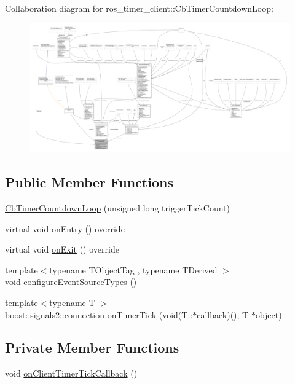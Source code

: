 Collaboration diagram for ros\+\_\+timer\+\_\+client\+:\+:Cb\+Timer\+Countdown\+Loop\+:
\nopagebreak
\begin{figure}[H]
\begin{center}
\leavevmode
\includegraphics[width=350pt]{classros__timer__client_1_1CbTimerCountdownLoop__coll__graph}
\end{center}
\end{figure}
\subsection*{Public Member Functions}
\begin{DoxyCompactItemize}
\item 
\hyperlink{classros__timer__client_1_1CbTimerCountdownLoop_aadceff62d42bac73682da8d729fe9c36}{Cb\+Timer\+Countdown\+Loop} (unsigned long trigger\+Tick\+Count)
\item 
virtual void \hyperlink{classros__timer__client_1_1CbTimerCountdownLoop_ae547ef69c9ce8029b0f5f27120155c9f}{on\+Entry} () override
\item 
virtual void \hyperlink{classros__timer__client_1_1CbTimerCountdownLoop_aa671fabe23945e85e65cee7a3c1e761b}{on\+Exit} () override
\item 
{\footnotesize template$<$typename T\+Object\+Tag , typename T\+Derived $>$ }\\void \hyperlink{classros__timer__client_1_1CbTimerCountdownLoop_a8e0193f4b75805b2b15fe6e63c631670}{configure\+Event\+Source\+Types} ()
\item 
{\footnotesize template$<$typename T $>$ }\\boost\+::signals2\+::connection \hyperlink{classros__timer__client_1_1CbTimerCountdownLoop_a7ebf87093607e9497f18eb0ded9fc1f9}{on\+Timer\+Tick} (void(T\+::$\ast$callback)(), T $\ast$object)
\end{DoxyCompactItemize}
\subsection*{Private Member Functions}
\begin{DoxyCompactItemize}
\item 
void \hyperlink{classros__timer__client_1_1CbTimerCountdownLoop_a8b3cbf593a9d3823cd1f56611fb0a0b3}{on\+Client\+Timer\+Tick\+Callback} ()
\end{DoxyCompactItemize}
